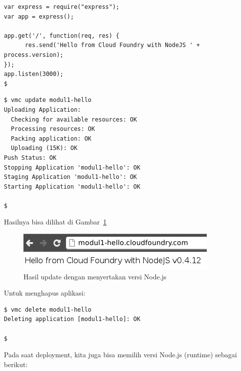 \lstset{language=Javascript,caption=Update: menambahkan versi Node.js ke app.js}
\begin{lstlisting}
var express = require("express"); 
var app = express(); 

app.get('/', function(req, res) { 
      res.send('Hello from Cloud Foundry with NodeJS ' + process.version); 
}); 
app.listen(3000); 
$ 
\end{lstlisting}

\lstset{language=bash,caption=Mengupdate aplikasi di server}
\begin{lstlisting}
$ vmc update modul1-hello 
Uploading Application: 
  Checking for available resources: OK 
  Processing resources: OK 
  Packing application: OK 
  Uploading (15K): OK   
Push Status: OK 
Stopping Application 'modul1-hello': OK 
Staging Application 'modul1-hello': OK                                          
Starting Application 'modul1-hello': OK                                         

$ 
\end{lstlisting}

Hasilnya bisa dilihat di Gambar~\ref{fig:modul1-hello-update}

  \begin{figure}
    \begin{center}
      \includegraphics[scale=0.5]{images/modul1-hello-update.jpg}
    \end{center}
    \caption{Hasil update dengan menyertakan versi Node.js}
    \label{fig:modul1-hello-update}
  \end{figure}

Untuk menghapus aplikasi:

\lstset{language=bash,caption=Menghapus aplikasi yang di-deploy di CF}
\begin{lstlisting}
$ vmc delete modul1-hello 
Deleting application [modul1-hello]: OK 

$ 
\end{lstlisting}

Pada saat deployment, kita juga bisa memilih versi Node.js (runtime) sebagai berikut:

